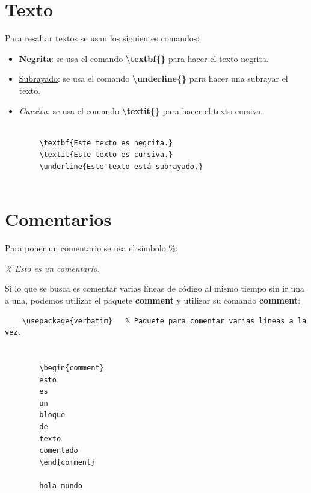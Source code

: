 \section{Texto}
\hspace{0.55cm}Para resaltar textos se usan los siguientes comandos:
\begin{itemize}
    \item \textbf{Negrita}: se usa el comando \textbf{\textbackslash{textbf\{\}}} para hacer el texto negrita.
    \item \underline{Subrayado}: se usa el comando \textbf{\textbackslash{underline\{\}}} para hacer una subrayar el texto.
    \item \textit{Cursiva}: se usa el comando \textbf{\textbackslash{textit\{\}}} para hacer el texto cursiva.
\end{itemize}
\begin{lstlisting}
    
        \textbf{Este texto es negrita.}
        \textit{Este texto es cursiva.}
        \underline{Este texto está subrayado.}
    
\end{lstlisting}



\section{Comentarios}
\hspace{0.55cm}Para poner un comentario se usa el símbolo \%:
\begin{center}
    \textit{\% Esto es un comentario.}
\end{center}

Si lo que se busca es comentar varias líneas de código al mismo tiempo sin ir una a una, podemos utilizar el paquete \textbf{comment} y utilizar su comando \textbf{comment}:
\begin{lstlisting}
    \usepackage{verbatim}   % Paquete para comentar varias líneas a la vez.
    
    
        \begin{comment}
        esto
        es
        un
        bloque
        de
        texto
        comentado
        \end{comment}
        
        hola mundo
    
\end{lstlisting}

